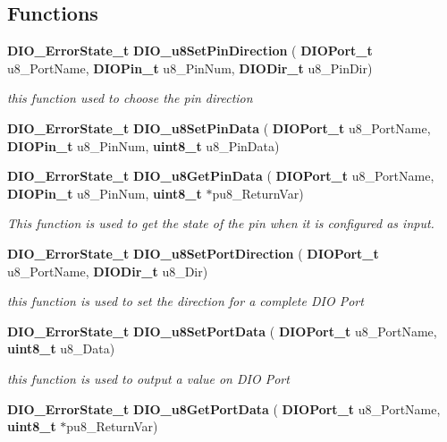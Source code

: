 \subsection*{Functions}
\begin{DoxyCompactItemize}
\item 
\textbf{ D\+I\+O\+\_\+\+Error\+State\+\_\+t} \textbf{ D\+I\+O\+\_\+u8\+Set\+Pin\+Direction} (\textbf{ D\+I\+O\+Port\+\_\+t} u8\+\_\+\+Port\+Name, \textbf{ D\+I\+O\+Pin\+\_\+t} u8\+\_\+\+Pin\+Num, \textbf{ D\+I\+O\+Dir\+\_\+t} u8\+\_\+\+Pin\+Dir)
\begin{DoxyCompactList}\small\item\em this function used to choose the pin direction \end{DoxyCompactList}\item 
\textbf{ D\+I\+O\+\_\+\+Error\+State\+\_\+t} \textbf{ D\+I\+O\+\_\+u8\+Set\+Pin\+Data} (\textbf{ D\+I\+O\+Port\+\_\+t} u8\+\_\+\+Port\+Name, \textbf{ D\+I\+O\+Pin\+\_\+t} u8\+\_\+\+Pin\+Num, \textbf{ uint8\+\_\+t} u8\+\_\+\+Pin\+Data)
\item 
\textbf{ D\+I\+O\+\_\+\+Error\+State\+\_\+t} \textbf{ D\+I\+O\+\_\+u8\+Get\+Pin\+Data} (\textbf{ D\+I\+O\+Port\+\_\+t} u8\+\_\+\+Port\+Name, \textbf{ D\+I\+O\+Pin\+\_\+t} u8\+\_\+\+Pin\+Num, \textbf{ uint8\+\_\+t} $\ast$pu8\+\_\+\+Return\+Var)
\begin{DoxyCompactList}\small\item\em This function is used to get the state of the pin when it is configured as input. \end{DoxyCompactList}\item 
\textbf{ D\+I\+O\+\_\+\+Error\+State\+\_\+t} \textbf{ D\+I\+O\+\_\+u8\+Set\+Port\+Direction} (\textbf{ D\+I\+O\+Port\+\_\+t} u8\+\_\+\+Port\+Name, \textbf{ D\+I\+O\+Dir\+\_\+t} u8\+\_\+\+Dir)
\begin{DoxyCompactList}\small\item\em this function is used to set the direction for a complete D\+IO Port \end{DoxyCompactList}\item 
\textbf{ D\+I\+O\+\_\+\+Error\+State\+\_\+t} \textbf{ D\+I\+O\+\_\+u8\+Set\+Port\+Data} (\textbf{ D\+I\+O\+Port\+\_\+t} u8\+\_\+\+Port\+Name, \textbf{ uint8\+\_\+t} u8\+\_\+\+Data)
\begin{DoxyCompactList}\small\item\em this function is used to output a value on D\+IO Port \end{DoxyCompactList}\item 
\textbf{ D\+I\+O\+\_\+\+Error\+State\+\_\+t} \textbf{ D\+I\+O\+\_\+u8\+Get\+Port\+Data} (\textbf{ D\+I\+O\+Port\+\_\+t} u8\+\_\+\+Port\+Name, \textbf{ uint8\+\_\+t} $\ast$pu8\+\_\+\+Return\+Var)

\end{DoxyCompactItemize}
